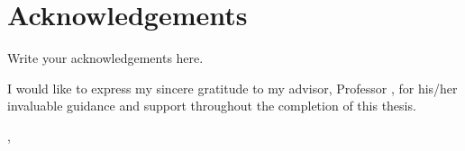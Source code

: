 \chapter*{Acknowledgements}
\thispagestyle{fancy}

Write your acknowledgements here.

I would like to express my sincere gratitude to my advisor, Professor \advisorname, for his/her invaluable guidance and support throughout the completion of this thesis.

\vspace{20mm}

\begin{flushright}
  \submitmonth, \submityear\\[5pt]
  \authorname
\end{flushright}

